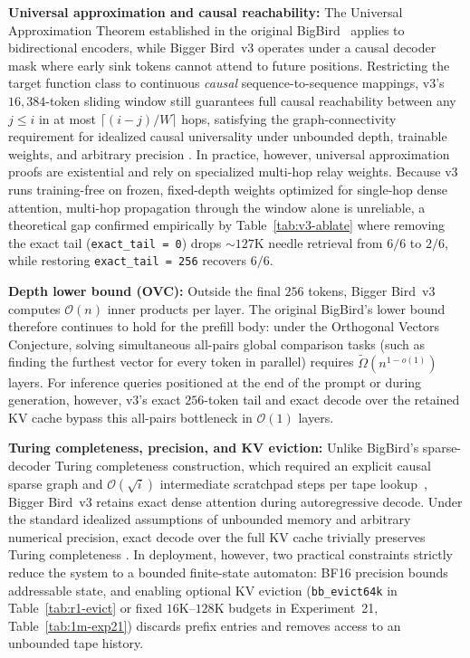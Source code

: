 \documentclass[11pt]{article}
\begin{document}
\textbf{Universal approximation and causal reachability:}
The Universal Approximation Theorem established in the original BigBird~\cite{zaheer2020bigbird} applies to bidirectional encoders, while Bigger Bird~v3 operates under a causal decoder mask where early sink tokens cannot attend to future positions. Restricting the target function class to continuous \emph{causal} sequence-to-sequence mappings, v3's $16{,}384$-token sliding window still guarantees full causal reachability between any $j \le i$ in at most $\lceil (i - j) / W \rceil$ hops, satisfying the graph-connectivity requirement for idealized causal universality under unbounded depth, trainable weights, and arbitrary precision \cite{yun2020connections}. In practice, however, universal approximation proofs are existential and rely on specialized multi-hop relay weights. Because v3 runs training-free on frozen, fixed-depth weights optimized for single-hop dense attention, multi-hop propagation through the window alone is unreliable, a theoretical gap confirmed empirically by Table~\ref{tab:v3-ablate} where removing the exact tail (\texttt{exact\_tail = 0}) drops $\sim 127\text{K}$ needle retrieval from $6/6$ to $2/6$, while restoring \texttt{exact\_tail = 256} recovers $6/6$.

\textbf{Depth lower bound (OVC):}
Outside the final $256$ tokens, Bigger Bird~v3 computes $\mathcal{O}(n)$ inner products per layer. The original BigBird's lower bound~\cite{zaheer2020bigbird} therefore continues to hold for the prefill body: under the Orthogonal Vectors Conjecture, solving simultaneous all-pairs global comparison tasks (such as finding the furthest vector for every token in parallel) requires $\widetilde{\Omega}(n^{1-o(1)})$ layers. For inference queries positioned at the end of the prompt or during generation, however, v3's exact $256$-token tail and exact decode over the retained KV cache bypass this all-pairs bottleneck in $\mathcal{O}(1)$ layers.

\textbf{Turing completeness, precision, and KV eviction:}
Unlike BigBird's sparse-decoder Turing completeness construction, which required an explicit causal sparse graph and $\mathcal{O}(\sqrt{i})$ intermediate scratchpad steps per tape lookup~\cite{zaheer2020bigbird}, Bigger Bird~v3 retains exact dense attention during autoregressive decode. Under the standard idealized assumptions of unbounded memory and arbitrary numerical precision, exact decode over the full KV cache trivially preserves Turing completeness \cite{perez2019turing}. In deployment, however, two practical constraints strictly reduce the system to a bounded finite-state automaton: BF16 precision bounds addressable state, and enabling optional KV eviction (\texttt{bb\_evict64k} in Table~\ref{tab:r1-evict} or fixed $16\text{K}$--$128\text{K}$ budgets in Experiment~21, Table~\ref{tab:1m-exp21}) discards prefix entries and removes access to an unbounded tape history.
\end{document}
